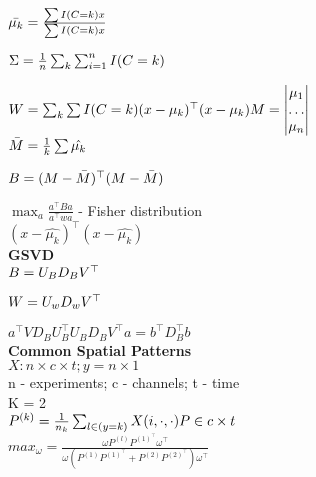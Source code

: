\documentclass[11pt]{article}
\begin{document}
 
  $\bar{\mu_k} = \frac{\sum I(C=k)x}{\sum I(C=k)x} \\ $
  
  
  $\Sigma=\frac{1}{n} \sum_{k} \sum_{i=1}^n I(C=k) \\$

 $W = \sum_{k} \sum I(C=k)(x-\mu_k)^{\top}(x-\mu_k) \\
  M = 
  \begin{vmatrix}
  \mu_1 \\
  \ldots \\
  \mu_n
  \end{vmatrix}$ \\

$ \bar{M} = \frac{1}{k}\sum \hat{\mu_k} \\$


$B = (M-\bar{M})^{\top}(M-\bar{M}) \\$

$\max_{a} \frac{a^{\top}Ba}{a^{\top}wa}$ - Fisher distribution \\

$(x - \hat{\mu_k})^{\top}(x - \hat{\mu_k})$ \\

\textbf{GSVD} \\

$B = U_B D_B V^{\top} \\ $

$ W = U_w D_w V^{\top} \\$

$a^{\top}V D_B U_B^{\top} U_B D_B V^{\top} a = b^{\top} D_B^{\top}b$ \\


\textbf{Common Spatial Patterns} \\

$X: n \times c \times t ; 
y = n \times 1 $ \\
n - experiments; c - channels; t - time \\

K = 2 \\
$P^{(k)} = \frac{1}{n_k} \sum_{l \in (y=k)} X(i, \cdot, \cdot) \\
P \in c \times t $ \\

$max_\omega = \frac{\omega P^{(l)}P^{(1)^{\top}}\omega^{\top}}{\omega(P^{(1)}P^{(1)^{\top}} + P^{(2)}P^{(2)^{\top}})\omega^{\top}} $ \\
\end{document}
